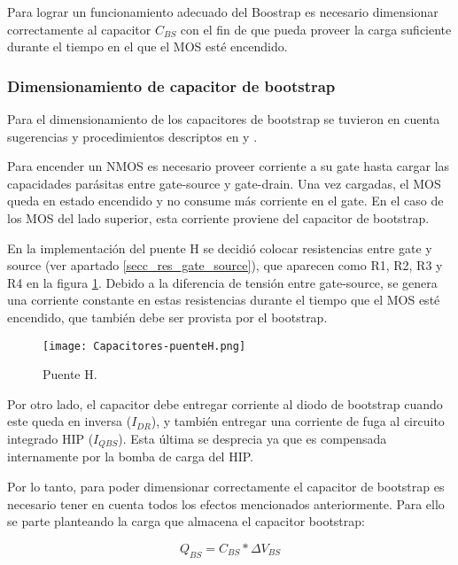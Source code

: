 \noindent Para lograr un funcionamiento adecuado del Boostrap es necesario dimensionar correctamente al capacitor $C_{BS}$ con el fin de que pueda proveer la carga suficiente durante el tiempo en el que el MOS esté encendido.


\subsubsection{Dimensionamiento de capacitor de bootstrap}

\noindent Para el dimensionamiento de los capacitores de bootstrap se tuvieron en cuenta sugerencias y procedimientos descriptos en \cite{HIP4081A_AN9405} y \cite{HIP4081A_FN3659}.

\noindent Para encender un NMOS es necesario proveer corriente a su gate hasta cargar las capacidades parásitas entre gate-source y gate-drain. Una vez cargadas, el MOS queda en estado encendido y no consume más corriente en el gate. En el caso de los MOS del lado superior, esta corriente proviene del capacitor de bootstrap. 

\noindent En la implementación del puente H se decidió colocar resistencias entre gate y source (ver apartado \ref{secc_res_gate_source}), que aparecen como R1, R2, R3 y R4 en la figura \ref{fig:img_capacitores-puenteH}. Debido a la diferencia de tensión entre gate-source, se genera una corriente constante en estas resistencias durante el tiempo que el MOS esté encendido, que también debe ser provista por el  bootstrap.

\begin{figure}[H]
	\centering
	\texttt{[image: Capacitores-puenteH.png]}
	\caption{Puente H.}
	\label{fig:img_capacitores-puenteH}
\end{figure}

\noindent Por otro lado, el capacitor debe entregar corriente al diodo de bootstrap cuando este queda en inversa ($I_{DR}$), y también entregar una corriente de fuga al circuito integrado HIP ($I_{QBS}$). Esta última se desprecia ya que es compensada internamente por la bomba de carga del HIP.

\noindent Por lo tanto, para poder dimensionar correctamente el capacitor de bootstrap es necesario tener en cuenta todos los efectos mencionados anteriormente. Para ello se parte planteando la carga que almacena el capacitor bootstrap:

\begin{equation} \label{eq_carga-cap-bootstrap}
Q_{BS}=C_{BS}*\Delta V_{BS}
\end{equation}

